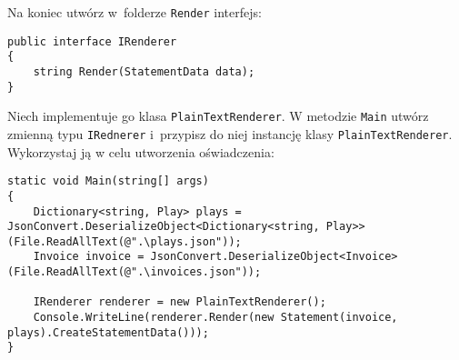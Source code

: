 Na koniec utwórz w~folderze \texttt{Render} interfejs:
\begin{lstlisting}
public interface IRenderer
{
	string Render(StatementData data);
}
\end{lstlisting}
Niech implementuje go klasa \texttt{PlainTextRenderer}. W metodzie \texttt{Main} utwórz zmienną typu \texttt{IRednerer} i~przypisz do niej instancję klasy \texttt{PlainTextRenderer}. Wykorzystaj ją w celu utworzenia oświadczenia:
\begin{lstlisting}
static void Main(string[] args)
{
	Dictionary<string, Play> plays = JsonConvert.DeserializeObject<Dictionary<string, Play>>(File.ReadAllText(@".\plays.json"));
	Invoice invoice = JsonConvert.DeserializeObject<Invoice>(File.ReadAllText(@".\invoices.json"));
	
	IRenderer renderer = new PlainTextRenderer();
	Console.WriteLine(renderer.Render(new Statement(invoice, plays).CreateStatementData()));
}
\end{lstlisting}